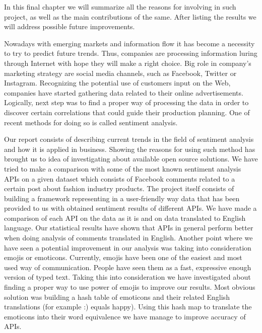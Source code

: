 In this final chapter we will summarize all the reasons for involving in such project, as well as the main contributions of the same. After listing the results we will address possible future improvements.

Nowadays with emerging markets and information flow it has become a necessity to try to predict future trends. Thus, companies are processing information luring through Internet with hope they will make a right choice. Big role in company's marketing strategy are social media channels, such as Facebook, Twitter or Instagram. Recognizing the potential use of customers input on the Web, companies have started gathering data related to their online advertisements. Logically, next step was to find a proper way of processing the data in order to discover certain correlations that could guide their production planning. One of recent methods for doing so is called sentiment analysis.

Our report consists of describing current trends in the field of sentiment analysis and how it is applied in business. Showing the reasons for using such method has brought us to idea of investigating about available open source solutions. We have tried to make a comparison with some of the most known sentiment analysis APIs on a given dataset which consists of Facebook comments related to a certain post about fashion industry products. The project itself consists of building a framework representing in a user-friendly way data that has been provided to us with obtained sentiment results of different APIs. We have made a comparison of each API on the data as it is and on data translated to English language. Our statistical results have shown that APIs in general perform better when doing analysis of comments translated in English. Another point where we have seen a potential improvement in our analysis was taking into consideration emojis or emoticons. Currently, emojis have been one of the easiest and most used way of communication. People have seen them as a fast, expressive enough version of typed text. Taking this into consideration we have investigated about finding a proper way to use power of emojis to improve our results. Most obvious solution was building a hash table of emoticons and their related English translations (for example :) equals happy). Using this hash map to translate the emoticons into their word equivalence we have manage to improve accuracy of APIs.
